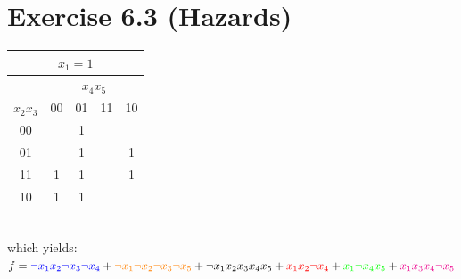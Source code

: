 \documentclass[10pt,a4paper]{scrartcl}
\begin{document}
\FloatBarrier
\section*{Exercise 6.3 (Hazards)}


\begin{tabular}{|c||c|c|c|c|}
  \hline
  \multicolumn{5}{|c|}{$x_1=1$} \\ \hline
            & \multicolumn{4}{c|}{$x_4x_5$} \\
$x_2x_3$ & 00                  & 01                  & 11                 & 10                  \\ \hline\hline
    00   &                     & \cellcolor{green}1  &                    &                     \\ \hline
    01   &                     & \cellcolor{green}1  &                    & \cellcolor{magenta}1\\ \hline
    11   & \cellcolor{red}1    & \cellcolor{yellow}1 &                    & \cellcolor{magenta}1\\ \hline
    10   & \cellcolor{red}1    & \cellcolor{yellow}1 &                    &                     \\
  \hline
\end{tabular}\\[5mm]
which yields: $f   =  \textcolor{blue}{\neg x_1x_2\neg x_3\neg x_4}+
                      \textcolor{orange}{\neg x_1\neg x_2\neg x_3\neg x_5}+
                      \neg x_1x_2x_3x_4x_5+
                      \textcolor{red}{x_1x_2\neg x_4}+
                      \textcolor{green}{x_1\neg x_4x_5}+
                      \textcolor{magenta}{x_1x_3x_4\neg x_5}$\\
\end{document}
